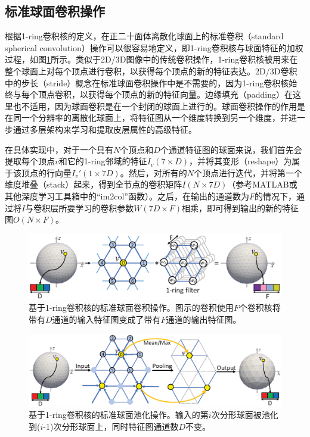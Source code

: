 \subsection{标准球面卷积操作}
根据1-ring卷积核的定义，在正二十面体离散化球面上的标准卷积（standard spherical convolution）操作可以很容易地定义，即1-ring卷积核与球面特征的加权过程，如图\ref{fig:fig_std_conv}所示。类似于2D/3D图像中的传统卷积操作，1-ring卷积核被用来在整个球面上对每个顶点进行卷积，以获得每个顶点的新的特征表达。2D/3D卷积中的步长（stride）概念在标准球面卷积操作中是不需要的，因为1-ring卷积核始终与每个顶点卷积，以获得每个顶点的新的特征向量。边缘填充（padding）在这里也不适用，因为球面卷积是在一个封闭的球面上进行的。球面卷积操作的作用是在同一个分辨率的离散化球面上，将特征图从一个维度转换到另一个维度，并进一步通过多层架构来学习和提取皮层属性的高级特征。

在具体实现中，对于一个具有$N$个顶点和$D$个通道特征图的球面来说，我们首先会提取每个顶点$v$和它的1-ring邻域的特征$I_v(7\times D)$，并将其变形（reshape）为属于该顶点的行向量$I_v'(1\times 7D)$。然后，对所有的$N$个顶点进行迭代，并将第一个维度堆叠（stack）起来，得到全节点的卷积矩阵$I(N\times 7D)$（参考MATLAB或其他深度学习工具箱中的“im2col”函数）。之后，在输出的通道数为$F$的情况下，通过将$I$与卷积层所要学习的卷积参数$W(7D\times F)$相乘，即可得到输出的新的特征图$O(N\times F)$。

\begin{figure}[t]
	\centering
	\includegraphics[width=\linewidth]{figure/figure_convolution.eps}
	\caption{基于1-ring卷积核的标准球面卷积操作。图示的卷积使用$F$个卷积核将带有$D$通道的输入特征图变成了带有$F$通道的输出特征图。}
	\label{fig:fig_std_conv}
\end{figure}

\begin{figure}[t]
	\centering
	\includegraphics[width=\linewidth]{figure/figure_pooling_layer.eps}
	\caption{基于1-ring卷积核的标准球面池化操作。输入的第$i$次分形球面被池化到($i$-1)次分形球面上，同时特征图通道数$D$不变。}
	\label{fig:fig_std_pooling}
\end{figure}

